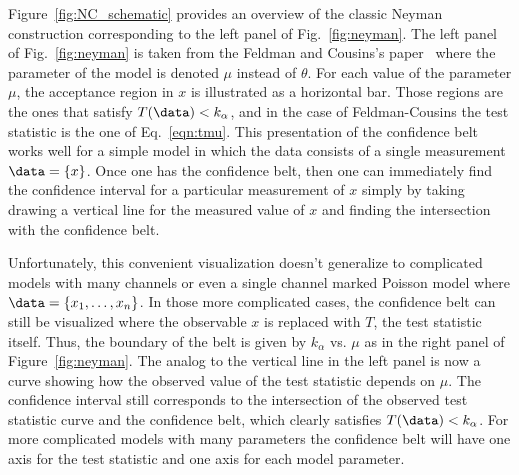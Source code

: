 Figure~\ref{fig:NC_schematic} provides an overview of the classic Neyman construction corresponding to the left panel of Fig.~\ref{fig:neyman}.  The left panel of  Fig.~\ref{fig:neyman} is taken from the Feldman and Cousins's paper~\cite{Feldman:1997qc} where the parameter of the model is denoted $\mu$ instead of $\theta$.  For each value of the parameter $\mu$, the acceptance region in $x$ is illustrated as a horizontal bar.  Those regions are the ones that satisfy $T(\data)<k_\alpha$, and in the case of Feldman-Cousins the test statistic is the one of Eq.~\ref{eqn:tmu}.  This presentation of the confidence belt works well for a simple model in which the data consists of a single measurement $\data=\{x\}$.  Once one has the confidence belt, then one can immediately find the confidence interval for a particular measurement of $x$ simply by taking drawing a vertical line for the measured value of $x$ and finding the intersection with the confidence belt.


Unfortunately, this convenient visualization doesn't generalize to complicated models with many channels or even a single channel marked Poisson model where $\data=\{x_1,\dots,x_n\}$.  In those more complicated cases, the confidence belt can still be visualized where the observable $x$ is replaced with $T$, the test statistic itself.  Thus, the boundary of the belt is given by $k_\alpha$ vs. $\mu$ as in the right panel of Figure~\ref{fig:neyman}. The analog to the vertical line in the left panel is now a curve showing how the observed value of the test statistic depends on $\mu$.  The confidence interval still corresponds to the intersection of the observed test statistic curve and the confidence belt, which clearly satisfies $T(\data)<k_\alpha$.  For more complicated models with many parameters the confidence belt will have one axis for the test statistic and one axis for each model parameter.
